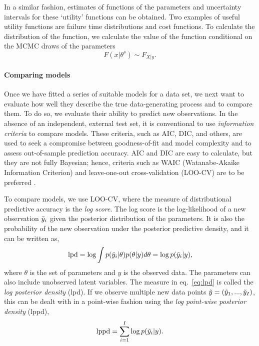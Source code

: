 In a similar fashion, estimates of functions of the parameters and uncertainty intervals for these `utility' functions can be obtained. Two examples of useful utility functions are failure time distributions and cost functions. To calculate the distribution of the function, we calculate the value of the function conditional on the MCMC draws of the parameters
\begin{equation}
  F(x|\theta^s) \sim F_{X|y}.
\end{equation}

\paragraph*{Comparing models}

Once we have fitted a series of suitable models for a data set, we next want to evaluate how well they describe the true data-generating process and to compare them. To do so, we evaluate their ability to predict new observations. In the absence of an independent, external test set, it is conventional to use \textit{information criteria} to compare models. These criteria, such as AIC, DIC, and others, are used to seek a compromise between goodness-of-fit and model complexity and to assess out-of-sample prediction accuracy. AIC and DIC are easy to calculate, but they are not fully Bayesian; hence, criteria such as WAIC (Watanabe-Akaike Information Criterion) and leave-one-out cross-validation (LOO-CV) are to be preferred \citep{Vehtari2017}.

To compare models, we use LOO-CV, where the measure of distributional predictive accuracy is the \emph{log score}. The log score is the log-likelihood of a new observation $\Tilde{y}_i$ given the posterior distribution of the parameters. It is also the probability of the new observation under the posterior predictive density, and it can be written as,
\begin{equation} \label{eq:lpd}
 \hbox{lpd} = \log \int p(\Tilde{y}_i|\theta)p(\theta|y)d\theta = \log p(\Tilde{y}_i | y),
\end{equation}
where $\theta$ is the set of parameters and $y$ is the observed data. The parameters can also include unobserved latent variables. The measure in eq.~\eqref{eq:lpd} is called the \textit{log posterior density} (lpd). If we observe multiple new data points $\Tilde{y} = (\Tilde{y}_1, ..., \Tilde{y}_I)$, this can be dealt with in a point-wise fashion using the \textit{log point-wise posterior density} (lppd),
\begin{equation} \label{eq:lppd}
 \hbox{lppd} = \sum^I_{i = 1} \log p(\Tilde{y}_i|y).
\end{equation}

